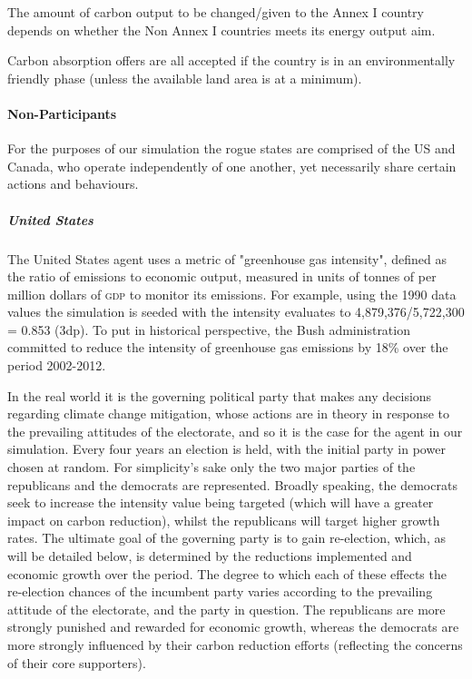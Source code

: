 The amount of carbon output to be changed/given to the Annex I country depends on whether the Non Annex I countries meets its energy output aim.

Carbon absorption offers are all accepted if the country is in an environmentally friendly phase (unless the available land area is at a minimum). 

\paragraph{Non-Participants}

For the purposes of our simulation the rogue states are comprised of the US and Canada, who operate independently of one another, yet necessarily share certain actions and behaviours. 

\subparagraph{United States}

The United States agent uses a metric of "greenhouse gas intensity", defined as the ratio of emissions to economic output, measured in units of tonnes of \CO per million dollars of \textsc{gdp} to monitor its emissions. For example, using the 1990 data values the simulation is seeded with the intensity evaluates to 4,879,376/5,722,300 = 0.853 (3dp). To put in historical perspective, the Bush administration committed to reduce the intensity of greenhouse gas emissions by 18\% over the period 2002-2012.

In the real world it is the governing political party that makes any decisions regarding climate change mitigation, whose actions are in theory in response to the prevailing attitudes of the electorate, and so it is the case for the agent in our simulation. Every four years an election is held, with the initial party in power chosen at random. For simplicity's sake only the two major parties of the republicans and the democrats are represented. Broadly speaking, the democrats seek to increase the intensity value being targeted (which will have a greater impact on carbon reduction), whilst the republicans will target higher growth rates. The ultimate goal of the governing party is to gain re-election, which, as will be detailed below, is determined by the reductions implemented and economic growth over the period. The degree to which each of these effects the re-election chances of the incumbent party varies according to the prevailing attitude of the electorate, and the party in question. The republicans are more strongly punished and rewarded for economic growth, whereas the democrats are more strongly influenced by their carbon reduction efforts (reflecting the concerns of their core supporters). 

